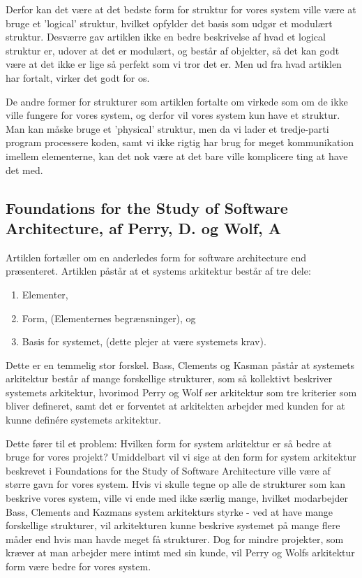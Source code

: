 \documentclass[10pt,a4paper,danish]{article}
\begin{document}
Derfor kan det være at det bedste form for struktur for vores system ville være at bruge et 'logical' struktur, hvilket opfylder det basis som udgør et modulært struktur. Desværre gav artiklen ikke en bedre beskrivelse af hvad et logical struktur er, udover at det er modulært, og består af objekter, så det kan godt være at det ikke er lige så perfekt som vi tror det er. Men ud fra hvad artiklen har fortalt, virker det godt for os.

De andre former for strukturer som artiklen fortalte om virkede som om de ikke ville fungere for vores system, og derfor vil vores system kun have et struktur. Man kan måske bruge et 'physical' struktur, men da vi lader et tredje-parti program processere koden, samt vi ikke rigtig har brug for meget kommunikation imellem elementerne, kan det nok være at det bare ville komplicere ting at have det med.

\subsection{Foundations for the Study of Software Architecture, af Perry, D. og Wolf, A}
Artiklen fortæller om en anderledes form for software architecture end præsenteret. Artiklen påstår at et systems arkitektur består af tre dele: 
\begin{enumerate}
\item Elementer,
\item Form, (Elementernes begrænsninger), og
\item Basis for systemet, (dette plejer at være systemets krav).
\end{enumerate}
Dette er en temmelig stor forskel. Bass, Clements og Kasman påstår at systemets arkitektur består af mange forskellige strukturer, som så kollektivt beskriver systemets arkitektur, hvorimod Perry og Wolf ser arkitektur som tre kriterier som bliver defineret, samt det er forventet at arkitekten arbejder med kunden for at kunne definére systemets arkitektur. 

Dette fører til et problem: Hvilken form for system arkitektur er så bedre at bruge for vores projekt? Umiddelbart vil vi sige at den form for system arkitektur beskrevet i Foundations for the Study of Software Architecture ville være af større gavn for vores system. Hvis vi skulle tegne op alle de strukturer som kan beskrive vores system, ville vi ende med ikke særlig mange, hvilket modarbejder Bass, Clements and Kazmans system arkitekturs styrke - ved at have mange forskellige strukturer, vil arkitekturen kunne beskrive systemet på mange flere måder end hvis man havde meget få strukturer. Dog for mindre projekter, som kræver at man arbejder mere intimt med sin kunde, vil Perry og Wolfs arkitektur form være bedre for vores system. 
\end{document}
